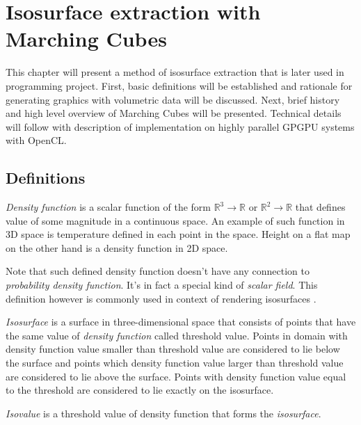 \chapter{Isosurface extraction with Marching Cubes}
\label{chap:marchingcubes}

This chapter will present a method of isosurface extraction that is later used
in programming project. First, basic definitions will be established and
rationale for generating graphics with volumetric data will be discussed.
Next, brief history and high level overview of Marching Cubes will be presented.
Technical details will follow with description of implementation on highly
parallel GPGPU systems with OpenCL.

\section{Definitions}

\begin{defn}
\label{def:density function}
\emph{Density function} is a scalar function of the form
$\mathbb{R}^3\rightarrow\mathbb{R}$ or $\mathbb{R}^2\rightarrow\mathbb{R}$
that defines value of some magnitude in a continuous space. An example of such
function in 3D space is temperature defined in each point in the space. Height
on a flat map on the other hand is a density function in 2D space.

Note that such defined density function doesn't have any connection to
\emph{probability density function}. It's in fact a special kind of
\emph{scalar field}. This definition however is commonly used in context of
rendering isosurfaces \parencite{gpugems3ch01}.
\end{defn}

\begin{defn} \emph{Isosurface} is a
surface in three-dimensional space that consists of points that have the same
value of \emph{density function} called threshold value.
Points
in domain with density function value smaller than threshold value are considered to
lie below the surface and points which density function value larger than threshold
value are considered to lie above the surface. Points with density function
value equal to the threshold are considered to lie exactly on the isosurface.
\end{defn}

\begin{defn} \emph{Isovalue} is a threshold value of density function that forms the
  \emph{isosurface}.
\end{defn}

